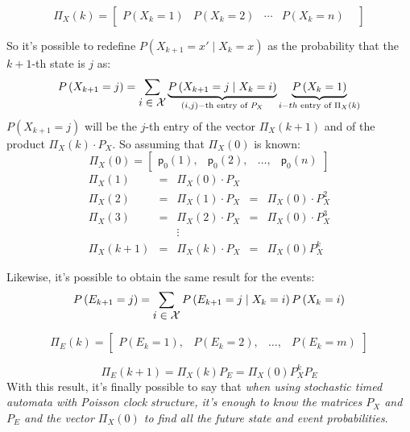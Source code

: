 \documentclass[12pt,a4paper]{article}
\newcommand*{\transp}{\mathsf{p}}
\begin{document}
\bigskip
$$
\Pi_X(k)=
\left[
\begin{matrix}
P(X_k=1)&
P(X_k=2)&
\cdots&
P(X_k=n)&
\end{matrix}
\right]
$$

\bigskip
\noindent
So it's possible to redefine $P(X_{k+1} = x' \mid X_k = x)$ as the probability that the $k+1$-th state is $j$ as:
$$
P\left(X_{k+1}=j\right)=\sum_{\mathlarger{i\in \mathcal{X}}}
{
\underbrace{P\left(X_{k+1}=j  \mid  X_k=i\right)}_{(i,j)-\text{th}\text{ entry of }P_X}
\underbrace{P\left(X_k=1\right)}_{i-th\text{ entry of }\Pi_X(k)}
}
$$ 
$P(X_{k+1} = j)$ will be the $j$-th entry of the vector $\Pi_X(k+1)$ and of the product $\Pi_X(k) \cdot P_X$. 
So assuming that $\Pi_X(0)$ is known:
$$
\Pi_X(0)=
\left[
\begin{matrix}
\transp_0(1),&
\transp_0(2),&
\dots,&
\transp_0(n)
\end{matrix}
\right]
$$
$$
\begin{matrix}
\Pi_X(1)&=&\Pi_X(0) \cdot P_X\\
\Pi_X(2)&=&\Pi_X(1) \cdot P_X&=&\Pi_X(0) \cdot P_X^2\\
\Pi_X(3)&=&\Pi_X(2) \cdot P_X&=&\Pi_X(0) \cdot P_X^3\\
&&\vdots\\
\Pi_X(k+1)&=&\Pi_X(k) \cdot P_X&=&\Pi_X(0)P_X^k
\end{matrix}
$$

\bigskip
\noindent
Likewise, it's possible to obtain the same result for the events: 
$$
P\left(E_{k+1}=j\right)=\sum_{\mathlarger{i\in\mathcal{X}}}{P\left(E_{k+1}=j \mid X_k=i\right)P\left(X_k=i\right)}
$$

$$
\Pi_E(k)=
\left[
\begin{matrix}
P\left(E_k=1\right),&
P\left(E_k=2\right),&
\dots,&
P\left(E_k=m\right)
\end{matrix}
\right]
$$

$$
\Pi_E(k+1)=\Pi_X(k)P_E=\Pi_X(0)P_X^kP_E
$$
With this result, it's finally possible to say that \emph{when using stochastic timed automata with Poisson clock structure, it's enough to know the matrices $P_X$ and $P_E$ and the vector $\Pi_X(0)$ to find all the future state and event probabilities}. 
\end{document}
